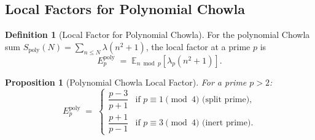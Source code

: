 \documentclass[11pt,a4paper]{article}
\theoremstyle{plain}
\newtheorem{proposition}[theorem]{Proposition}
\theoremstyle{definition}
\newtheorem{definition}[theorem]{Definition}
\begin{document}
\subsection{Local Factors for Polynomial Chowla}

\begin{definition}[Local Factor for Polynomial Chowla]
For the polynomial Chowla sum $S_{\mathrm{poly}}(N) = \sum_{n \leq N} \lambda(n^2+1)$, the local factor at a prime $p$ is
\begin{equation}\label{eq:local-poly}
E_p^{\mathrm{poly}} \;=\; \mathbb{E}_{n \bmod p}\!\left[\lambda_p(n^2+1)\right].
\end{equation}
\end{definition}

\begin{proposition}[Polynomial Chowla Local Factor]\label{prop:local-poly}
For a prime $p > 2$:
\begin{equation}\label{eq:poly-local}
E_p^{\mathrm{poly}} \;=\; \begin{cases} \dfrac{p - 3}{p + 1} & \text{if } p \equiv 1 \pmod{4} \text{ (split prime)}, \\[6pt] \dfrac{p + 1}{p - 1} & \text{if } p \equiv 3 \pmod{4} \text{ (inert prime)}. \end{cases}
\end{equation}
\end{proposition}
\end{document}
